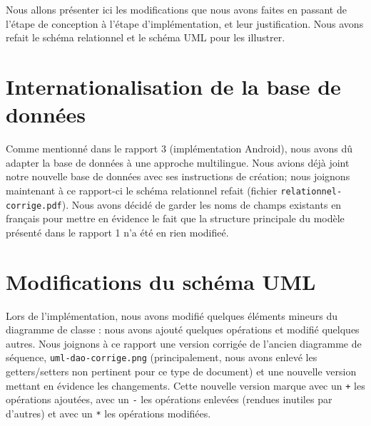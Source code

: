 \documentclass[a4paper,10pt]{article}
\begin{document}

Nous allons présenter ici les modifications que nous avons faites en passant de l'étape de conception à l'étape d'implémentation, et leur justification. Nous avons refait le schéma relationnel et le schéma UML pour les illustrer.

\section{Internationalisation de la base de données}

Comme mentionné dans le rapport 3 (implémentation Android), nous avons dû adapter la base de données à une approche multilingue.
Nous avions déjà joint notre nouvelle base de données avec ses instructions de création; nous joignons maintenant à ce rapport-ci le schéma relationnel refait (fichier \texttt{relationnel-corrige.pdf}). Nous avons décidé de garder les noms de champs existants en français pour mettre en évidence le fait que la structure principale du modèle présenté dans le rapport 1 n'a été en rien modifieé.

\section{Modifications du schéma UML}

Lors de l'implémentation, nous avons modifié quelques éléments mineurs du diagramme de classe : nous avons ajouté quelques opérations et modifié quelques autres. Nous joignons à ce rapport une version corrigée de l'ancien diagramme de séquence, \texttt{uml-dao-corrige.png} (principalement, nous avons enlevé les getters/setters non pertinent pour ce type de document) et une nouvelle version mettant en évidence les changements. Cette nouvelle version marque avec un \texttt{+} les opérations ajoutées, avec un \texttt{-} les opérations enlevées (rendues inutiles par d'autres) et avec un \texttt{*} les opérations modifiées.
\end{document}
